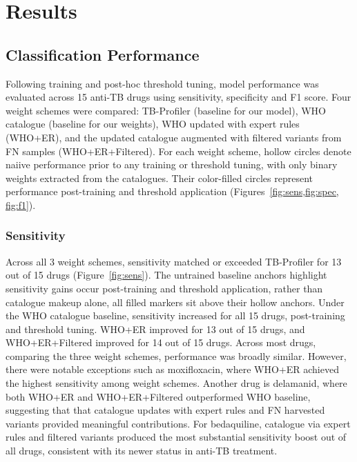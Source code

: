 \graphicspath{{Figures/Results}}

\chapter{Results}\label{ch:results}

\section{Classification Performance}\label{results:sec:model_perf}
Following training and post-hoc threshold tuning, model performance was evaluated across 15 anti-TB drugs using sensitivity, specificity and F1 score. Four weight schemes were compared: TB-Profiler (baseline for our model), WHO catalogue (baseline for our weights), WHO updated with expert rules (WHO+ER), and the updated catalogue augmented with filtered variants from FN samples (WHO+ER+Filtered). For each weight scheme, hollow circles denote naiive performance prior to any training or threshold tuning, with only binary weights extracted from the catalogues. Their color-filled circles represent performance post-training and threshold application (Figures~\ref{fig:sens,fig:spec, fig:f1}).

\subsection*{Sensitivity}
Across all 3 weight schemes, sensitivity matched or exceeded TB-Profiler for 13 out of 15 drugs (Figure~\ref{fig:sens}). The untrained baseline anchors highlight sensitivity gains occur post-training and threshold application, rather than catalogue makeup alone, all filled markers sit above their hollow anchors. Under the WHO catalogue baseline, sensitivity increased for all 15 drugs, post-training and threshold tuning. WHO+ER improved for 13 out of 15 drugs, and WHO+ER+Filtered improved for 14 out of 15 drugs. Across most drugs, comparing the three weight schemes, performance was broadly similar. However, there were notable exceptions such as moxifloxacin, where WHO+ER achieved the highest sensitivity among weight schemes. Another drug is delamanid, where both WHO+ER and WHO+ER+Filtered outperformed WHO baseline, suggesting that that catalogue updates with expert rules and FN harvested variants provided meaningful contributions. For bedaquiline, catalogue via expert rules and filtered variants produced the most substantial sensitivity boost out of all drugs, consistent with its newer status in anti-TB treatment.

